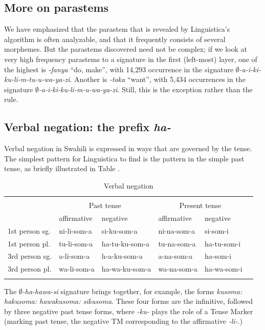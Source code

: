 \documentclass[output=paper,colorlinks,citecolor=brown]{langscibook}
\begin{document}
\subsection{More on parastems}

We have emphasized that the parastem that is revealed by Linguistica's algorithm is often analyzable, and that it frequently consists of several morphemes. But the parastems discovered need not be complex; if we look at very high frequency parastems to a signature in the first (left-most) layer, one of the highest is \textit{-fanya} ``do, make'', with 14,293 occurrence in the signature \textit{$\emptyset$-a-i-ki-ku-li-m-tu-u-wa-ya-zi}. Another is \textit{-taka} ``want'', with 5,434 occurrences in the signature  \textit{$\emptyset$-a-i-ki-ku-li-m-u-wa-ya-zi}. Still, this is the exception rather than the rule.
 
\subsection{Verbal negation: the prefix \textit{ha-}}

Verbal negation in Swahili is expressed in ways that are governed by the tense. The simplest pattern for Linguistica to find  is the pattern in the simple past tense, as briefly illustrated in Table .

\begin{table}
\begin{tabular}{llllll} \lsptoprule
\multicolumn{5}{c}{\textit{ku-som-a} `to read'}\\
 & \multicolumn{2}{c}{Past tense} & \multicolumn{2}{c}{Present tense} \\
 & affirmative & negative & affirmative & negative \\
1st person sg. & ni-li-som-a & si-ku-som-a & ni-na-som-a & si-som-i \\
1st person pl.& tu-li-som-a  & ha-tu-ku-som-a & tu-na-som-a & ha-tu-som-i \\
3rd person sg.& a-li-som-a  & h-a-ku-som-a & a-na-som-a & ha-som-i \\
3rd person pl. & wa-li-som-a & ha-wa-ku-som-a & wa-na-som-a & ha-wa-som-i \\\lspbottomrule
\end{tabular} 
\caption{Verbal negation}
\label{negation}
\end{table}

The \textit{$\emptyset$-ha-hawa-si} signature brings together, for example, the forms \textit{kusoma: hakusoma: hawakusoma: sikusoma}. These four forms are the infinitive, followed by three negative past tense forms, where \textit{-ku-} plays the role of a Tense Marker (marking past tense, the negative TM corresponding to the affirmative \textit{-li-}.) 
\end{document}
